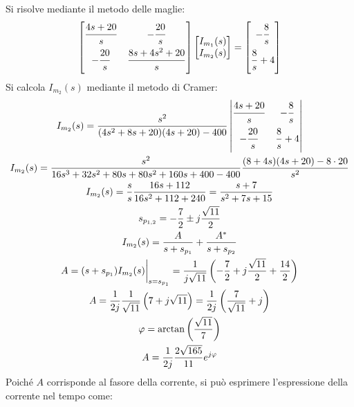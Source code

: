 \documentclass{article}
\newcommand{\Frac}[2]{\displaystyle\frac{\strut{#1}}{\strut{#2}}}
\begin{document}
Si risolve mediante il metodo delle maglie:
\begin{gather*}
    \begin{bmatrix}
        \Frac{4s+20}{s}&-\Frac{20}{s}\\
        -\Frac{20}{s}&\Frac{8s+4s^2+20}{s}
    \end{bmatrix}\begin{bmatrix}
        I_{m_1}(s)\\I_{m_2}(s)
    \end{bmatrix}=\begin{bmatrix}
        -\Frac{8}{s}\\\Frac{8}{s}+4
    \end{bmatrix}
\end{gather*}
Si calcola $I_{m_2}(s)$ mediante il metodo di Cramer:
\begin{gather*}
    I_{m_2}(s)=\displaystyle\frac{s^2}{(4s^2+8s+20)(4s+20)-400}\begin{vmatrix}
        \Frac{4s+20}{s}&
        -\Frac{8}{s}\\-\Frac{20}{s}&\Frac{8}{s}+4
    \end{vmatrix}\\
    I_{m_2}(s)=\displaystyle\frac{s^2}{16s^3+32s^2+80s+80s^2+160s+400-400}\frac{(8+4s)(4s+20)-8\cdot20}{s^2}\\
    I_{m_2}(s)=\displaystyle\frac{s}{s}\frac{16s+112}{16s^2+112+240}=\frac{s+7}{s^2+7s+15}\\
    s_{p_{1,2}}=-\displaystyle\frac{7}{2}\pm j\frac{\sqrt{11}}{2}\\
    I_{m_2}(s)=\displaystyle\frac{A}{s+s_{p_1}}+\frac{A^*}{s+s_{p_2}}\\
    A=(s+s_{p_1})I_{m_2}(s)\bigg|_{s=s_{p_1}}=\displaystyle\frac{1}{j\sqrt{11}}\left(-\frac{7}{2}+j\frac{\sqrt{11}}{2}+\frac{14}{2}\right)\\
    A=\displaystyle\frac{1}{2j}\frac{1}{\sqrt{11}}\left(7+j\sqrt{11}\right)=\frac{1}{2j}\left(\frac{7}{\sqrt{11}}+j\right)\\
    \varphi=\arctan\left(\displaystyle\frac{\sqrt{11}}{7}\right)\\
    A=\displaystyle\frac{1}{2j}\frac{2\sqrt{165}}{11}e^{j\varphi}
\end{gather*}
Poiché $A$ corrisponde al fasore della corrente, si può esprimere l'espressione della corrente nel tempo come:
\end{document}
